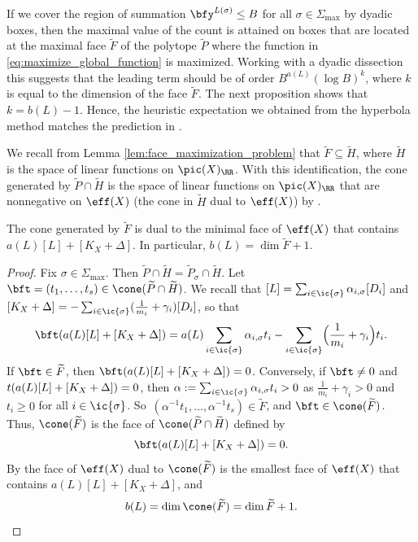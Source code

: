 If we cover the region of summation $\bfy^{L(\sigma)}\leq B$ for all $\sigma\in\Sigma_{\max}$
by dyadic boxes, then the maximal value of the count is attained on boxes
that are located at the maximal face $\widetilde{F}$ of the polytope $\widetilde{P}$ where the function
in \eqref{eq:maximize_global_function} is maximized.
Working with a dyadic dissection this suggests that the leading term should be
of order $B^{a(L)} (\log B)^k$, where $k$ is equal to the dimension of the face $\widetilde{F}$.
The next proposition shows that $k=b(L)-1$.
Hence, the heuristic expectation we obtained from the hyperbola method matches
the prediction in \cite[Conj.\,1.1]{PSTVA}.

We recall from Lemma \ref{lem:face_maximization_problem} that
$\widetilde F\subseteq\widetilde H$, where $\widetilde H$
is the space of linear functions on $\pic(X)_\RR$.
With this identification, the cone generated by $\widetilde P\cap \widetilde H$ is the space
of linear functions on $\pic(X)_{\RR}$ that are nonnegative on $\eff(X)$
(\ie the cone in $\widetilde H$ dual to $\eff(X)$) by \cite[Prop.\,1.2.8]{MR2810322}.

\begin{prop}
\label{prop:description_b}
The cone generated by $\widetilde F$ is dual to the minimal face of $\eff(X)$ that contains
$a(L)[L]+[K_X+\Delta]$. In particular, $b(L)= \dim \widetilde F+1$.
\end{prop}
\begin{proof}
Fix $\sigma\in\Sigma_{\max}$.
Then $\widetilde P\cap \widetilde H=\widetilde P_\sigma\cap \widetilde H$.
Let $\bft=(t_1,\dots,t_s)\in \cone(\widetilde P\cap \widetilde H)$.
We recall that $[L] = \sum_{i\in\ic{\sigma}} \alpha_{i,\sigma} [D_{i}]$ and
$[K_X+\Delta] = -\sum_{i\in\ic{\sigma}}(\frac 1{m_i} + \gamma_i)[D_{i}]$, so that
\[
\bft(a(L)[L] + [K_X+\Delta])
= a(L) \sum_{i\in\ic{\sigma}}\alpha_{i,\sigma} t_i
- \sum_{i\in\ic{\sigma}} \Bigl(\frac 1{m_i} + \gamma_i \Bigr) t_i.
\]
If $\bft\in \widetilde F$, then $\bft (a(L)[L] + [K_X+\Delta]) =0$.
Conversely, if $\bft\neq0$ and $t (a(L)[L] + [K_X+\nobreak\Delta]) =0$,
then $\alpha:=\sum_{i\in\ic{\sigma}}\alpha_{i,\sigma} t_i > 0$ as $\frac 1{m_i} + \gamma_i>0$
and $t_i\geq0$ for all $i\in\ic{\sigma}$.
So~$(\alpha^{-1}t_1,\dots,\alpha^{-1}t_s)\in \widetilde F$, and $\bft\in \cone(\widetilde F)$.
Thus, $\cone(\widetilde F)$ is the face of $\cone(\widetilde P\cap \widetilde H)$ defined by
\[
\bft(a(L)[L] + [K_X+\Delta]) =0.
\]
By \cite[Def.\,1.2.5, Prop.\,1.2.10]{MR2810322} the face of
$\eff(X)$ dual to $\cone(\widetilde F)$ is
the smallest face of $\eff(X)$ that contains $a(L)[L] + [K_X+\Delta]$, and
\begin{equation*}b(L)=\dim \cone(\widetilde F) = \dim \widetilde F+1.\qedhere\end{equation*}
\end{proof}

